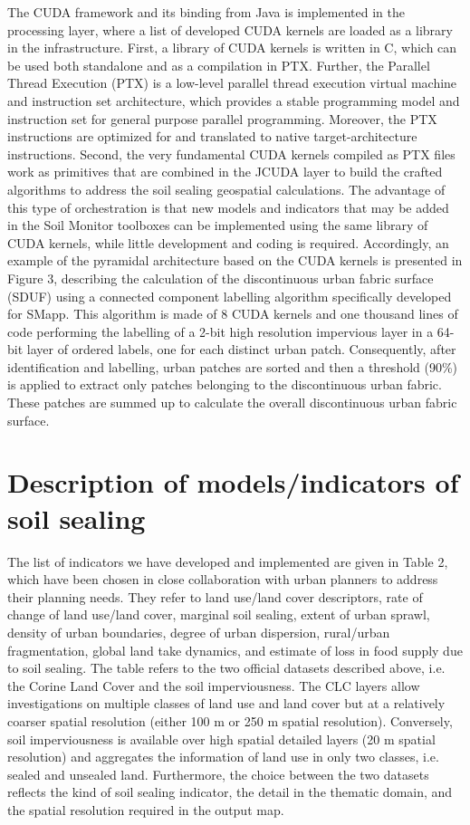 \documentclass[APA,LATO1COL,doublespace]{WileyNJD-v2}
\begin{document}
The CUDA framework and its binding from Java is implemented in the processing layer, where a list of developed CUDA kernels are loaded as a library in the infrastructure. First, a library of CUDA kernels is written in C, which can be used both standalone and as a compilation in PTX. Further, the Parallel Thread Execution (PTX) is a low-level parallel thread execution virtual machine and instruction set architecture, which provides a stable programming model and instruction set for general purpose parallel programming. Moreover, the PTX instructions are optimized for and translated to native target-architecture instructions. Second, the very fundamental CUDA kernels compiled as PTX files work as primitives that are combined in the JCUDA layer to build the crafted algorithms to address the soil sealing geospatial calculations. The advantage of this type of orchestration is that new models and indicators that may be added in the Soil Monitor toolboxes can be implemented using the same library of CUDA kernels, while little development and coding is required. 
Accordingly, an example of the pyramidal architecture based on the CUDA kernels is presented in Figure 3, describing the calculation of the discontinuous urban fabric surface (SDUF) using a connected component labelling algorithm specifically developed for SMapp. This algorithm is made of 8 CUDA kernels and one thousand lines of code performing the labelling of a 2-bit high resolution impervious layer in a 64-bit layer of ordered labels, one for each distinct urban patch. Consequently, after identification and labelling, urban patches are sorted and then a threshold (90\%) is applied to extract only patches belonging to the discontinuous urban fabric. These patches are summed up to calculate the overall discontinuous urban fabric surface.

\section{Description of models/indicators of soil sealing} The list of indicators we have developed and implemented are given in Table 2, which have been chosen in close collaboration with urban planners to address their planning needs. They refer to land use/land cover descriptors, rate of change of land use/land cover, marginal soil sealing, extent of urban sprawl, density of urban boundaries, degree of urban dispersion, rural/urban fragmentation, global land take dynamics, and estimate of loss in food supply due to soil sealing. The table refers to the two official datasets described above, i.e. the Corine Land Cover and the soil imperviousness. The CLC layers allow investigations on multiple classes of land use and land cover but at a relatively coarser spatial resolution (either 100 m or 250 m spatial resolution). Conversely, soil imperviousness is available over high spatial detailed layers (20 m spatial resolution) and aggregates the information of land use in only two classes, i.e. sealed and unsealed land. Furthermore, the choice between the two datasets reflects the kind of soil sealing indicator, the detail in the thematic domain, and the spatial resolution required in the output map. 
\end{document}
